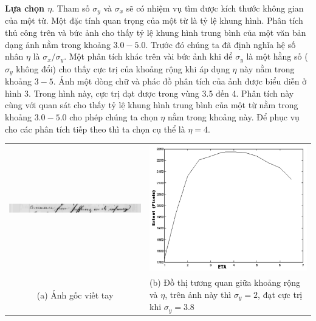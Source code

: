 \documentclass[12pt, a4paper]{article}
\begin{document}
\textbf{Lựa chọn $\eta$}. Tham số $\sigma_y$ và $\sigma_x$ sẽ có nhiệm vụ tìm được kích thước không gian của một từ. Một đặc tính quan trọng của một từ là tỷ lệ khung hình. Phân tích thủ công trên và bức ảnh cho thấy tỷ lệ khung hình trung bình của một văn bản dạng ảnh nằm trong khoảng $3.0 - 5.0$. Trước đó chúng ta đã định nghĩa hệ số nhân $\eta$ là $\sigma_x / \sigma_y$. Một phân tích khác trên vài bức ảnh khi để $\sigma_y$ là một hằng số ($\sigma_y$ không đổi) cho thấy cực trị của khoảng rộng khi áp dụng $\eta$ này nằm trong khoảng $3 - 5$. Ảnh một dòng chữ và phác đồ phân tích của ảnh được biểu diễn ở hình 3. Trong hình này, cực trị đạt được trong vùng 3.5 đến 4. Phân tích này cùng với quan sát cho thấy tỷ lệ khung hình trung bình của một từ nằm trong khoảng $3.0 - 5.0$ cho phép chúng ta chọn $\eta$ nằm trong khoảng này. Để phục vụ cho các phân tích tiếp theo thì ta chọn cụ thể là $\eta = 4$.

\begin{table}[ht]
\centering
\begin{tabular}{cL}
\includegraphics[scale=0.52]{imgs/a_line_img_1.png} & \includegraphics[scale=0.52]{imgs/ploty2n38.png} \\
(a) Ảnh gốc viết tay & (b) Đồ thị tương quan giữa khoảng rộng và $\eta$, trên ảnh này thì $\sigma_y = 2$, đạt cực trị khi $\sigma_y = 3.8$ \\
\end{tabular}
\label{tab:gt}
\end{table}
\end{document}
